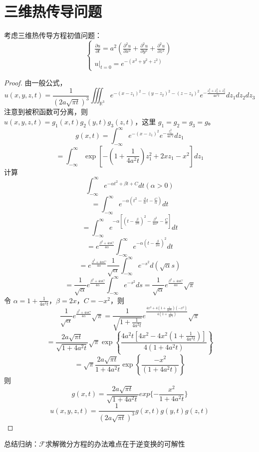\documentclass[linespread=1.5,openany]{book}%
\theoremstyle{plain}
\begin{document}
{{{					\section{三维热传导问题}
					考虑三维热传导方程初值问题：
					\[
					\begin{cases}
						\frac{\partial u}{\partial t}=a^{2}\left(\frac{\partial^{2}u}{\partial x^{2}}+\frac{\partial^{2}u}{\partial y^{2}}+\frac{\partial^{2}u}{\partial z^{2}}\right)\\
						\left.u\right|_{t = 0}=e^{-(x^{2}+y^{2}+z^{2})}
					\end{cases}\]
					\begin{proof}
						由一般公式，\[u(x,y,z,t)=\frac{1}{(2a\sqrt{\pi t})^{3}}\iiint_{\mathbb{R}^{3}}e^{-(x - z_{1})^{2}-(y - z_{2})^{2}-(z - z_{3})^{2}}e^{-\frac{z_{1}^{2}+z_{2}^{2}+z_{3}^{2}}{4a^{2}t}}dz_{1}dz_{2}dz_{3}\]
						注意到被积函数可分离，则\\ \(u(x,y,z,t)=g_{1}(x,t)g_{2}(y,t)g_{3}(z,t)\)，这里 \(g_{1}=g_{2}=g_{3}=g\)。
						\[	g(x,t)=\int_{-\infty}^{\infty}e^{-(x - z_{1})^{2}}e^{-\frac{z_{1}^{2}}{4a^{2}t}}dz_{1}\]
						\[=\int_{-\infty}^{\infty}\exp\left[-\left(1+\frac{1}{4a^{2}t}\right)z_{1}^{2}+2xz_{1}-x^{2}\right]dz_{1}
						\]
						计算 \[\int_{-\infty}^{\infty}e^{-\alpha t^{2}+\beta t + C}dt(\alpha>0)\]
						\[=	\int_{-\infty}^{\infty}e^{-\alpha\left(t^{2}-\frac{\beta}{\alpha}t-\frac{C}{\alpha}\right)}dt\]
						\[=\int_{-\infty}^{\infty}e^{-\alpha\left[\left(t-\frac{\beta}{2\alpha}\right)^{2}-\frac{\beta^{2}}{4\alpha^{2}}-\frac{C}{\alpha}\right]}dt\]
						\[=e^{\frac{\beta^{2}+4\alpha C}{4\alpha}}\int_{-\infty}^{\infty}e^{- \alpha \left(t-\frac{\beta}{2\alpha}\right)^{2}}dt\]
						\[=e^{\frac{\beta^{2}+4\alpha C}{4\alpha}}\frac{1}{\sqrt{\alpha}}\int_{-\infty}^{\infty}e^{-s^{2}}d(\sqrt{\alpha}s)\]
						\[=\frac{1}{\sqrt{\alpha}}e^{\frac{\beta^{2}+4\alpha C}{4\alpha}}\int_{-\infty}^{\infty}e^{-s^{2}}ds=\frac{1}{\sqrt{\alpha}}e^{\frac{\beta^{2}+4\alpha C}{4\alpha}}\sqrt{\pi}
						\]
						令 \(\alpha = 1+\frac{1}{4a^{2}t}\)，\(\beta = 2x\)，\(C=-x^{2}\)，则
						\[\frac{1}{\sqrt{\alpha}}e^{\frac{\beta^{2}+4\alpha C}{4\alpha}}\sqrt{\pi}=\frac{1}{\sqrt{1+\frac{1}{4a^{2}t}}}e^{\frac{4x^{2}+4\left(1+\frac{1}{4a^{2}t}\right)(-x^{2})}{4\left(1+\frac{1}{4a^{2}t}\right)}}\sqrt{\pi}\]
						\[=\frac{2a\sqrt{\pi t}}{\sqrt{1 + 4a^{2}t}}\sqrt{\pi}\exp\left\{\frac{4a^{2}t\left[4x^{2}-4x^{2}\left(1+\frac{1}{4a^{2}t}\right)\right]}{4\left(1 + 4a^{2}t\right)}\right\}\]
						\[=\sqrt{\pi}\frac{2a\sqrt{\pi t}}{1 + 4a^{2}t}\exp\left\{\frac{-x^{2}}{(1 + 4a^{2}t)}\right\}\]
						则
						\[g(x,t)=\frac{2a\sqrt{\pi t}}{\sqrt{1+4a^2t}}exp\{-\frac{x^2}{1+4a^2t} \}\]
						\[u(x,y,z,t)=\frac{1}{(2a\sqrt{\pi t})^3}g(x,t)g(y,t)g(z,t)\]
					\end{proof}
					总结归纳：$\mathcal{F}$求解微分方程的办法难点在于逆变换的可解性
				}
				
}}
\end{document}
